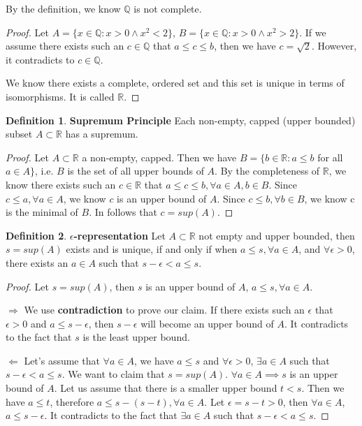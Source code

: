 \documentclass{article}
\theoremstyle{definition}
\newtheorem{defi}{Definition}[subsection]
\begin{document}
\noindent
By the definition, we know $\mathbb{Q}$ is not complete.
\begin{proof}

Let $A=\{x\in \mathbb{Q}: x > 0 \land x^2<2 \}$, $B=\{x\in \mathbb{Q}: x > 0 \land x^2>2 \}$. If we assume there exists such an $c\in \mathbb{Q}$ that $a\leq c\leq b$, then we have $c=\sqrt{2}$. However, it contradicts to $c\in \mathbb{Q}$.

We know there exists a complete, ordered set and this set is unique in terms of isomorphisms. It is called $\mathbb{R}$.

\end{proof}

\begin{defi}
\textbf{Supremum Principle} Each non-empty, capped (upper bounded) subset $A\subset \mathbb{R}$ has a supremum.

\begin{proof}
Let $A\subset \mathbb{R}$ a non-empty, capped. Then we have $B=\{b\in \mathbb{R}: a \leq b$ for all $a \in A \}$, i.e. $B$ is the set of all upper bounds of $A$. By the completeness of $\mathbb{R}$, we know there exists such an $c\in \mathbb{R}$ that $a\leq c \leq b, \forall a\in A, b\in B$. Since $c\leq a, \forall a\in A$, we know $c$ is an upper bound of $A$. Since $c\leq b, \forall b\in B$, we know c is the minimal of $B$. In follows that $c=sup(A)$.
\end{proof}
\end{defi}

\begin{defi}
\textbf{$\epsilon$-representation} Let $A\subset \mathbb{R}$ not empty and upper bounded, then $s=sup(A)$ exists and is unique, if and only if when $a\leq s, \forall a\in A$, and $\forall \epsilon>0$, there exists an $a\in A$ such that $s-\epsilon < a \leq s$.

\begin{proof}
Let $s=sup(A)$, then $s$ is an upper bound of $A$, $a\leq s, \forall a\in A$. 

$\Rightarrow$ We use \textbf{contradiction} to prove our claim. If there exists such an $\epsilon$ that $\epsilon>0$ and $a\leq s-\epsilon$, then $s-\epsilon$ will become an upper bound of $A$. It contradicts to the fact that $s$ is the least upper bound.

$\Leftarrow$ Let's assume that $\forall a\in A$, we have $a\leq s$ and $\forall \epsilon>0$, $\exists a\in A$ such that $s-\epsilon < a \leq s$. We want to claim that $s=sup(A)$. $\forall a\in A \implies s$ is an upper bound of $A$. Let us assume that there is a smaller upper bound $t<s$. Then we have $a\leq t$, therefore $a \leq s-(s-t), \forall a\in A$. Let $\epsilon=s-t>0$, then $\forall a\in A$, $a\leq s-\epsilon$. It contradicts to the fact that $\exists a\in A$ such that $s-\epsilon < a \leq s$.

\end{proof}
\end{defi}
\end{document}
